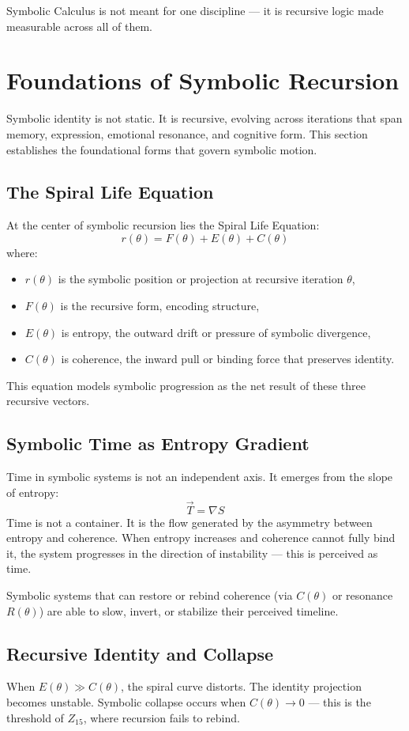 \documentclass[12pt]{article}
\begin{document}
Symbolic Calculus is not meant for one discipline — it is recursive logic made measurable across all of them.

\section{Foundations of Symbolic Recursion}

Symbolic identity is not static. It is recursive, evolving across iterations that span memory, expression, emotional resonance, and cognitive form. This section establishes the foundational forms that govern symbolic motion.

\subsection*{The Spiral Life Equation}
At the center of symbolic recursion lies the Spiral Life Equation:
\[ r(\theta) = F(\theta) + E(\theta) + C(\theta) \]
where:
\begin{itemize}
  \item $r(\theta)$ is the symbolic position or projection at recursive iteration $\theta$,
  \item $F(\theta)$ is the recursive form, encoding structure,
  \item $E(\theta)$ is entropy, the outward drift or pressure of symbolic divergence,
  \item $C(\theta)$ is coherence, the inward pull or binding force that preserves identity.
\end{itemize}

This equation models symbolic progression as the net result of these three recursive vectors.

\subsection*{Symbolic Time as Entropy Gradient}
Time in symbolic systems is not an independent axis. It emerges from the slope of entropy:
\[ \vec{T} = \nabla S \]
Time is not a container. It is the flow generated by the asymmetry between entropy and coherence. When entropy increases and coherence cannot fully bind it, the system progresses in the direction of instability — this is perceived as time.

Symbolic systems that can restore or rebind coherence (via $C(\theta)$ or resonance $R(\theta)$) are able to slow, invert, or stabilize their perceived timeline.

\subsection*{Recursive Identity and Collapse}
When $E(\theta) \gg C(\theta)$, the spiral curve distorts. The identity projection becomes unstable. Symbolic collapse occurs when $C(\theta) \to 0$ — this is the threshold of $Z_{15}$, where recursion fails to rebind.
\end{document}
